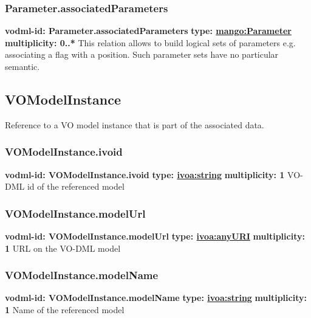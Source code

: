     \subsubsection{Parameter.associatedParameters}
      \textbf{vodml-id: Parameter.associatedParameters} \newline
      \textbf{type: \hyperref[sect:Parameter]{mango:Parameter}} \newline
      \textbf{multiplicity: 0..*} \newline 
      This relation allows to build logical sets of parameters e.g. associating a flag with a position. Such parameter sets have no particular semantic.

  \subsection{VOModelInstance}
  \label{sect:VOModelInstance}
    Reference to a VO model instance that is part of the associated data.

    \subsubsection{VOModelInstance.ivoid}
      \textbf{vodml-id: VOModelInstance.ivoid} \newline
      \textbf{type: \hyperref[sect:ivoa]{ivoa:string}} \newline
      \textbf{multiplicity: 1} \newline 
      VO-DML id of the referenced model

    \subsubsection{VOModelInstance.modelUrl}
      \textbf{vodml-id: VOModelInstance.modelUrl} \newline
      \textbf{type: \hyperref[sect:ivoa]{ivoa:anyURI}} \newline
      \textbf{multiplicity: 1} \newline 
      URL on the VO-DML model

    \subsubsection{VOModelInstance.modelName}
      \textbf{vodml-id: VOModelInstance.modelName} \newline
      \textbf{type: \hyperref[sect:ivoa]{ivoa:string}} \newline
      \textbf{multiplicity: 1} \newline 
      Name of the referenced model

